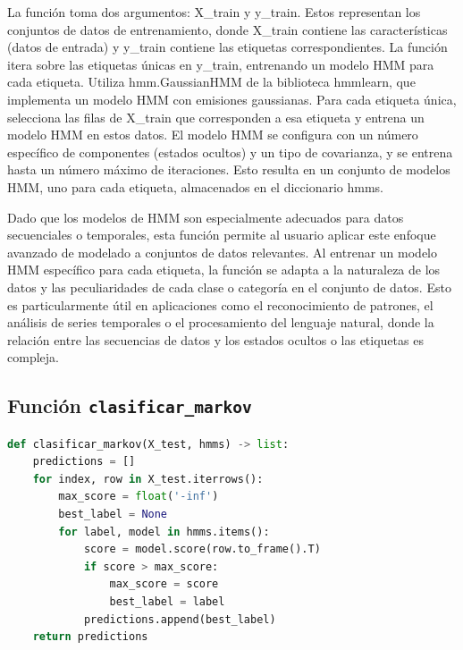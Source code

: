 \documentclass[12pt]{article}
\begin{document}
La función toma dos argumentos: X\_train y y\_train. Estos representan los conjuntos de datos de entrenamiento, donde X\_train contiene las características (datos de entrada) y y\_train contiene las etiquetas correspondientes. La función itera sobre las etiquetas únicas en y\_train, entrenando un modelo HMM para cada etiqueta. Utiliza hmm.GaussianHMM de la biblioteca hmmlearn, que implementa un modelo HMM con emisiones gaussianas. Para cada etiqueta única, selecciona las filas de X\_train que corresponden a esa etiqueta y entrena un modelo HMM en estos datos. El modelo HMM se configura con un número específico de componentes (estados ocultos) y un tipo de covarianza, y se entrena hasta un número máximo de iteraciones. Esto resulta en un conjunto de modelos HMM, uno para cada etiqueta, almacenados en el diccionario hmms.\vspace{1cm}


Dado que los modelos de HMM son especialmente adecuados para datos secuenciales o temporales, esta función permite al usuario aplicar este enfoque avanzado de modelado a conjuntos de datos relevantes. Al entrenar un modelo HMM específico para cada etiqueta, la función se adapta a la naturaleza de los datos y las peculiaridades de cada clase o categoría en el conjunto de datos. Esto es particularmente útil en aplicaciones como el reconocimiento de patrones, el análisis de series temporales o el procesamiento del lenguaje natural, donde la relación entre las secuencias de datos y los estados ocultos o las etiquetas es compleja.

\vspace{1cm}

\subsection*{Función \texttt{clasificar\_markov}}
\vspace{1cm}

\begin{lstlisting}[language=Python]
def clasificar_markov(X_test, hmms) -> list:
	predictions = []
	for index, row in X_test.iterrows():
		max_score = float('-inf')
		best_label = None
		for label, model in hmms.items():
			score = model.score(row.to_frame().T)
			if score > max_score:
				max_score = score
				best_label = label
			predictions.append(best_label)
	return predictions
	
\end{lstlisting}
\vspace{1cm}
\end{document}
